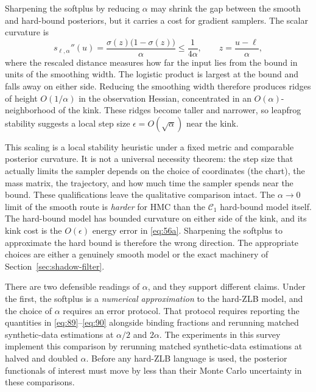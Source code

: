 \documentclass[11pt]{article}
\begin{document}
Sharpening the softplus by reducing \(\alpha\) may shrink the gap between the smooth and hard-bound posteriors, but it carries a cost for gradient samplers. The scalar curvature is
\begin{equation}\label{eq:91}
 s_{\ell,\alpha}''(u)=\frac{\sigma(z)\bigl(1-\sigma(z)\bigr)}{\alpha}
 \leq\frac1{4\alpha},
 \qquad z=\frac{u-\ell}{\alpha},
\end{equation}
where the rescaled distance measures how far the input lies from the bound in units of the smoothing width. The logistic product is largest at the bound and falls away on either side. Reducing the smoothing width therefore produces ridges of height \(O(1/\alpha)\) in the observation Hessian, concentrated in an \(O(\alpha)\)-neighborhood of the kink. These ridges become taller and narrower, so leapfrog stability suggests a local step size \(\epsilon=O(\sqrt\alpha)\) near the kink.

This scaling is a local stability heuristic under a fixed metric and comparable posterior curvature. It is not a universal necessity theorem: the step size that actually limits the sampler depends on the choice of coordinates (the chart), the mass matrix, the trajectory, and how much time the sampler spends near the bound. These qualifications leave the qualitative comparison intact. The \(\alpha\to0\) limit of the smooth route is \emph{harder} for HMC than the \(\mathcal C_1\) hard-bound model itself. The hard-bound model has bounded curvature on either side of the kink, and its kink cost is the \(O(\epsilon)\) energy error in \eqref{eq:56a}. Sharpening the softplus to approximate the hard bound is therefore the wrong direction. The appropriate choices are either a genuinely smooth model or the exact machinery of Section~\ref{sec:shadow-filter}.

There are two defensible readings of \(\alpha\), and they support different claims. Under the first, the softplus is a \emph{numerical approximation} to the hard-ZLB model, and the choice of \(\alpha\) requires an error protocol. That protocol requires reporting the quantities in \eqref{eq:89}--\eqref{eq:90} alongside binding fractions and rerunning matched synthetic-data estimations at \(\alpha/2\) and \(2\alpha\). The experiments in this survey implement this comparison by rerunning matched synthetic-data estimations at halved and doubled \(\alpha\). Before any hard-ZLB language is used, the posterior functionals of interest must move by less than their Monte Carlo uncertainty in these comparisons.
\end{document}
